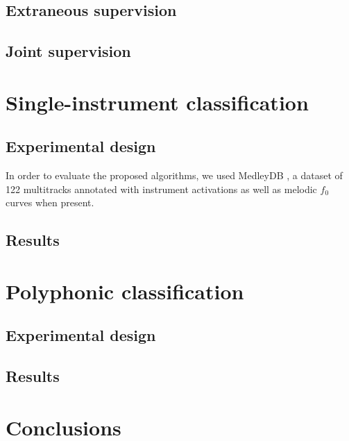 \documentclass{article}
\begin{document}
\subsection{Extraneous supervision}

\subsection{Joint supervision}


\section{Single-instrument classification}\label{sec:single-instrument}
\subsection{Experimental design}
In order to evaluate the proposed algorithms, we used MedleyDB \cite{Bittner2014}, a dataset of 122 multitracks annotated with instrument activations as well as melodic $f_0$ curves when present. 

\subsection{Results}


\section{Polyphonic classification}\label{sec:polyphonic}
\subsection{Experimental design}

\subsection{Results}


\section{Conclusions}


\end{document}
